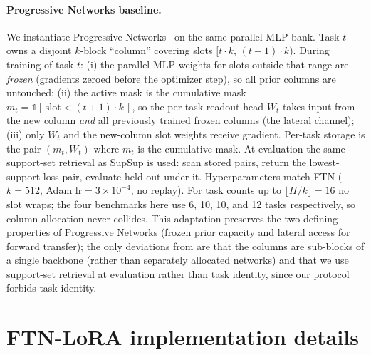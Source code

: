 \documentclass[11pt]{article}
\begin{document}
\paragraph{Progressive Networks baseline.}
We instantiate Progressive Networks~\citep{rusu2016progressive} on the same parallel-MLP bank. Task $t$ owns a disjoint $k$-block ``column'' covering slots $[t\cdot k,\,(t+1)\cdot k)$. During training of task $t$: (i) the parallel-MLP weights for slots outside that range are \emph{frozen} (gradients zeroed before the optimizer step), so all prior columns are untouched; (ii) the active mask is the cumulative mask $m_t = \mathbb{1}\!\left[\,\mathrm{slot} < (t+1)\cdot k\,\right]$, so the per-task readout head $W_t$ takes input from the new column \emph{and} all previously trained frozen columns (the lateral channel); (iii) only $W_t$ and the new-column slot weights receive gradient. Per-task storage is the pair $(m_t, W_t)$ where $m_t$ is the cumulative mask. At evaluation the same support-set retrieval as SupSup is used: scan stored pairs, return the lowest-support-loss pair, evaluate held-out under it. Hyperparameters match FTN ($k=512$, Adam $\mathrm{lr}=3\times10^{-4}$, no replay). For task counts up to $\lfloor H/k \rfloor = 16$ no slot wraps; the four benchmarks here use 6, 10, 10, and 12 tasks respectively, so column allocation never collides. This adaptation preserves the two defining properties of Progressive Networks (frozen prior capacity and lateral access for forward transfer); the only deviations from \citet{rusu2016progressive} are that the columns are sub-blocks of a single backbone (rather than separately allocated networks) and that we use support-set retrieval at evaluation rather than task identity, since our protocol forbids task identity.



\section{FTN-LoRA implementation details}\label{app:lora_impl}
\end{document}
